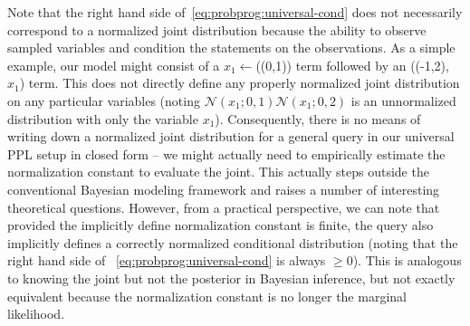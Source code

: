 Note that the right hand side of~\eqref{eq:probprog:universal-cond} does not necessarily
correspond to a normalized joint distribution because the ability to observe sampled variables and
condition the \sample statements on the observations.  As a simple example, our model
might consist of a $x_1 \leftarrow$\sample(\normal(0,1)) term followed by an \observe(\normal(-1,2),~$x_1$)
term.  This does not directly define any properly normalized joint distribution on any particular variables
(noting $\mathcal{N}(x_1;0,1) \mathcal{N}(x_1;0,2)$ is an unnormalized distribution with only the variable
$x_1$).  Consequently, there is no means of writing down a normalized joint distribution for a general
query in our universal PPL setup in closed form -- we might actually need to empirically estimate
the normalization constant to evaluate the joint.  This actually steps outside the conventional Bayesian
modeling framework and raises a number of interesting theoretical questions.  However, from a
practical perspective, we can note that provided the implicitly define normalization constant is finite,
the query also implicitly defines a correctly normalized conditional distribution (noting that the right
hand side of ~\eqref{eq:probprog:universal-cond} is always $\ge0$).
This is analogous to knowing the joint but not the posterior in Bayesian inference, but not exactly
equivalent because the normalization constant is no longer the marginal likelihood.

